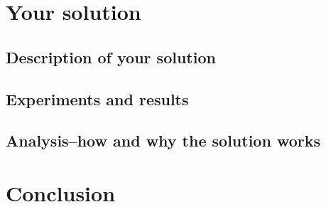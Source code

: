 \documentclass[12pt]{article}
\begin{document}
\section{Your solution}
\subsection{Description of your solution}

\subsection{Experiments and results}


\subsection{Analysis--how and why the solution works}

\section{Conclusion}


{\small }
\end{document}
